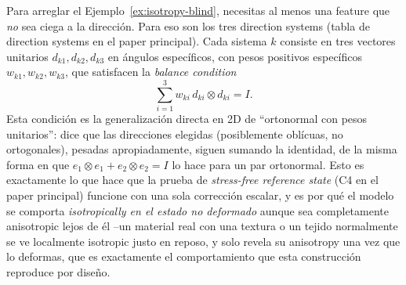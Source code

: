 \documentclass[11pt,a4paper]{article}
\begin{document}
Para arreglar el Ejemplo~\ref{ex:isotropy-blind}, necesitas al menos una
feature que \emph{no} sea ciega a la direcci\'on. Para eso son los tres
direction systems (tabla de direction systems en el paper principal).
Cada sistema $k$ consiste en tres vectores unitarios $d_{k1},d_{k2},
d_{k3}$ en \'angulos espec\'ificos, con pesos positivos espec\'ificos
$w_{k1},w_{k2},w_{k3}$, que satisfacen la \emph{balance condition}
\begin{equation}
 \sum_{i=1}^3 w_{ki}\,d_{ki}\otimes d_{ki} = I .
 \label{eq:balance}
\end{equation}
Esta condici\'on es la generalizaci\'on directa en 2D de ``ortonormal
con pesos unitarios'': dice que las direcciones elegidas (posiblemente
obl\'icuas, no ortogonales), pesadas apropiadamente, siguen sumando la
identidad, de la misma forma en que $e_1\otimes e_1+e_2\otimes e_2=I$
lo hace para un par ortonormal. Esto es exactamente lo que hace que la
prueba de \emph{stress-free reference state} (C4 en el paper principal)
funcione con una sola correcci\'on escalar, y es por qu\'e el modelo se
comporta \emph{isotropically en el estado no deformado} aunque sea
completamente anisotropic lejos de \'el --un material real con una
textura o un tejido normalmente se ve localmente isotropic justo en
reposo, y solo revela su anisotropy una vez que lo deformas, que es
exactamente el comportamiento que esta construcci\'on reproduce por
dise\~no.
\end{document}
